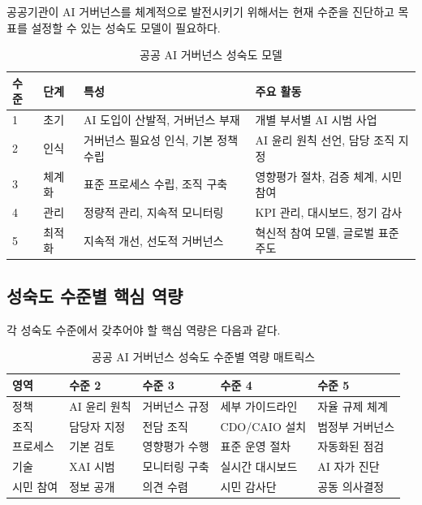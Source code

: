 공공기관이 AI 거버넌스를 체계적으로 발전시키기 위해서는 현재 수준을 진단하고 목표를 설정할 수 있는 성숙도 모델이 필요하다.

\begin{table}[htbp]
\centering
\caption{공공 AI 거버넌스 성숙도 모델}
\label{tab:18_maturity}
\begin{tabularx}{\textwidth}{p{1.5cm}p{2cm}Xp{4cm}}
\toprule
\textbf{수준} & \textbf{단계} & \textbf{특성} & \textbf{주요 활동} \\
\midrule
1 & 초기 & AI 도입이 산발적, 거버넌스 부재 & 개별 부서별 AI 시범 사업 \\
2 & 인식 & 거버넌스 필요성 인식, 기본 정책 수립 & AI 윤리 원칙 선언, 담당 조직 지정 \\
3 & 체계화 & 표준 프로세스 수립, 조직 구축 & 영향평가 절차, 검증 체계, 시민 참여 \\
4 & 관리 & 정량적 관리, 지속적 모니터링 & KPI 관리, 대시보드, 정기 감사 \\
5 & 최적화 & 지속적 개선, 선도적 거버넌스 & 혁신적 참여 모델, 글로벌 표준 주도 \\
\bottomrule
\end{tabularx}
\end{table}

\subsection{성숙도 수준별 핵심 역량}

각 성숙도 수준에서 갖추어야 할 핵심 역량은 다음과 같다.

\begin{table}[htbp]
\centering
\caption{공공 AI 거버넌스 성숙도 수준별 역량 매트릭스}
\label{tab:18_maturity_detail}
\begin{tabularx}{\textwidth}{p{2cm}p{2.5cm}p{2.5cm}p{2.5cm}X}
\toprule
\textbf{영역} & \textbf{수준 2} & \textbf{수준 3} & \textbf{수준 4} & \textbf{수준 5} \\
\midrule
정책 & AI 윤리 원칙 & 거버넌스 규정 & 세부 가이드라인 & 자율 규제 체계 \\
조직 & 담당자 지정 & 전담 조직 & CDO/CAIO 설치 & 범정부 거버넌스 \\
프로세스 & 기본 검토 & 영향평가 수행 & 표준 운영 절차 & 자동화된 점검 \\
기술 & XAI 시범 & 모니터링 구축 & 실시간 대시보드 & AI 자가 진단 \\
시민 참여 & 정보 공개 & 의견 수렴 & 시민 감사단 & 공동 의사결정 \\
\bottomrule
\end{tabularx}
\end{table}

